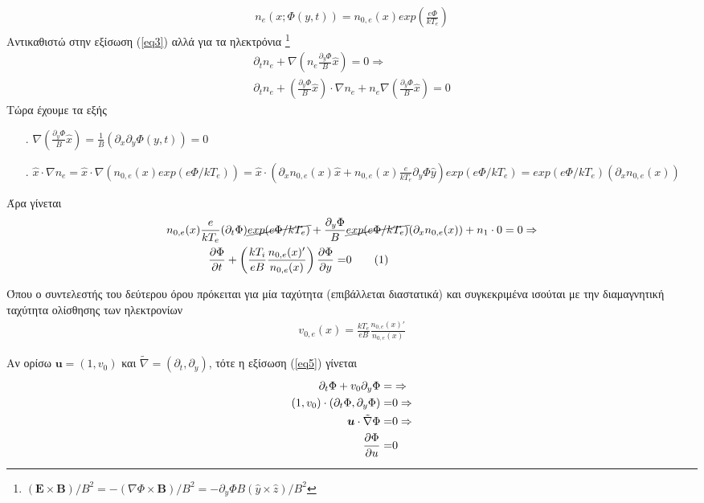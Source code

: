 \documentclass[a4paper]{article}
\newcommand\numberthis{\addtocounter{equation}{1}\tag{\theequation}}
\begin{document}
	  	\begin{align}\label{eq4}
	  		n_e(x;\Phi(y,t)) = n_{0,e}(x) exp\left(\frac{e\Phi}{kT_e}\right)
	  	\end{align}
	  Αντικαθιστώ στην εξίσωση (\ref{eq3}) αλλά για τα ηλεκτρόνια \footnote{$(\bm{E}\times\bm{B})/B^2= - (\nabla\Phi\times\bm{B})/B^2 = - \partial_y\Phi B (\hat{y}\times\hat{z})/B^2 $}
	  		\begin{align*} 
	  			\partial_tn_e   +  \nabla\left( n_e \frac{\partial_y\Phi}{B}\hat{x} \right)=0\Rightarrow\\
	  			 \partial_tn_e  + \left(\frac{\partial_y\Phi}{B}\hat{x}\right)\cdot \nabla n_e  + n_e \nabla\left(\frac{\partial_y\Phi}{B}\hat{x}\right)=0
	  		\end{align*}
	  	Τώρα έχουμε τα εξής 
	  		\begin{itemize}
	  			\item[.] $\nabla\left(\frac{\partial_y\Phi}{B}\hat{x}\right) = \frac{1}{B}(\partial_x\partial_y \Phi(y,t)) = 0$
	  			\item[.] $\hat{x}\cdot\nabla n_e = \hat{x}\cdot\nabla\left(n_{0,e}(x)exp(e\Phi /kT_e)\right) = \hat{x}\cdot\left(\partial_xn_{0,e}(x)\hat{x}+n_{0,e}(x)\frac{e}{kT_e}\partial_y\Phi \hat{y}\right)exp(e\Phi/kT_e) = exp(e\Phi/kT_e) ( \partial_xn_{0,e}(x))$
	  		\end{itemize}
	  	Άρα γίνεται 
	  		\begin{align*}\label{eq5}
	  		n_{0,e}(x)\frac{e}{kT_e}(\partial_t\Phi)\cancel{exp(e\Phi/kT_e)} +\frac{\partial_y\Phi}{B}&\cancel{exp(e\Phi/kT_e)} ( \partial_xn_{0,e}(x)) + n_1\cdot 0  = 0 \Rightarrow\\
	  			\pdv{\Phi}{t} + \left(\frac{kT_i}{eB}\frac{n_{0,e}(x)'}{n_{0,e}(x)}\right)\pdv{\Phi}{y}=&0 \numberthis
	  		\end{align*}
	  		
	  		Όπου ο συντελεστής του δεύτερου όρου πρόκειται για μία ταχύτητα (επιβάλλεται διαστατικά) και συγκεκριμένα ισούται με την διαμαγνητική ταχύτητα ολίσθησης των ηλεκτρονίων
	  			\begin{align}\label{eq6}
	  				v_{0,e}(x) = \frac{kT_e}{eB}\frac{n_{0,e}(x)'}{n_{0,e}(x)}
	  			\end{align}
	  			
	  	Αν ορίσω $\bm{u} = (1,v_0)$ και $\tilde{\nabla}=(\partial_t,\partial_y)$, τότε η εξίσωση (\ref{eq5}) γίνεται 
	  		\begin{align*}
	  			\partial_t\Phi + v_0\partial_y\Phi=&\Rightarrow\\ 
	  			(1,v_0)\cdot(\partial_t\Phi,\partial_y\Phi) =&0 \Rightarrow\\
	  			 \bm{u}\cdot\tilde{\nabla}\Phi =& 0 \Rightarrow\\
	  			 	\pdv{\Phi}{u}=&0
	  		\end{align*}
	  		
\end{document}
